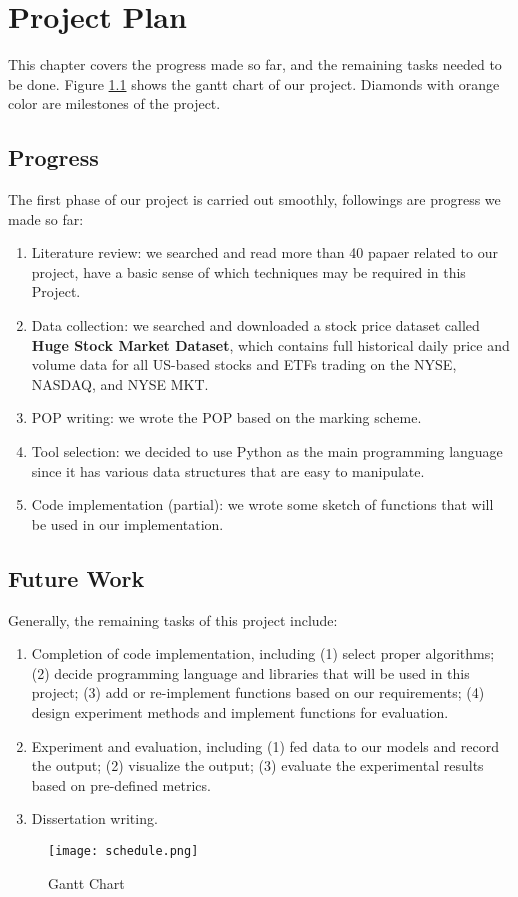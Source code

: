 \chapter{Project Plan}
\label{ch:plan}
This chapter covers the progress made so far, and the remaining tasks needed to be done. Figure \ref{fig:Gantt} shows the gantt chart of our project. Diamonds with orange color are milestones of the project.

\section{Progress}
The first phase of our project is carried out smoothly, followings are progress we made so far:
\begin{enumerate}
    \item Literature review: we searched and read more than 40 papaer related to our project, have a basic sense of which techniques may be required in this Project.
    \item Data collection: we searched and downloaded a stock price dataset called \textbf{Huge Stock Market Dataset}, which contains full historical daily price and volume data for all US-based stocks and ETFs trading on the NYSE, NASDAQ, and NYSE MKT.
    \item POP writing: we wrote the POP based on the marking scheme.
    \item Tool selection: we decided to use Python as the main programming language since it has various data structures that are easy to manipulate. 
    \item Code implementation (partial): we wrote some sketch of functions that will be used in our implementation.
\end{enumerate}

\section{Future Work}
Generally, the remaining tasks of this project include:
\begin{enumerate}
    \item Completion of code implementation, including (1) select proper algorithms; (2) decide programming language and libraries that will be used in this project; (3) add or re-implement functions based on our requirements; (4) design experiment methods and implement functions for evaluation.
    \item Experiment and evaluation, including (1) fed data to our models and record the output; (2) visualize the output; (3) evaluate the experimental results based on pre-defined metrics.
    \item Dissertation writing.
\end{enumerate}

\begin{figure}[!htbp]
    \centering
    \texttt{[image: schedule.png]}
    \caption{Gantt Chart}
    \label{fig:Gantt}
\end{figure} 